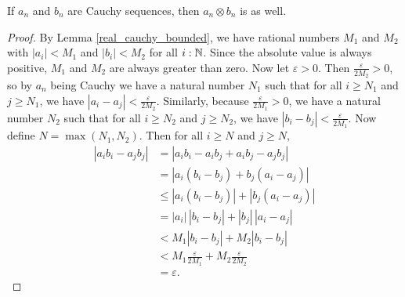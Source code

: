 \documentclass[../../math.tex]{subfiles}
\begin{document}
\begin{lemma}
    If $a_n$ and $b_n$ are Cauchy sequences, then $a_n \otimes b_n$ is as well.
\end{lemma}
\begin{proof}
    By Lemma \ref{real_cauchy_bounded}, we have rational numbers $M_1$ and $M_2$
    with $|a_i| < M_1$ and $|b_i| < M_2$ for all $i : \mathbb{N}$.  Since the absolute
    value is always positive, $M_1$ and $M_2$ are always greater than zero.  Now
    let $\varepsilon > 0$.  Then $\frac{\varepsilon}{2M_2} > 0$, so by $a_n$
    being Cauchy we have a natural number $N_1$ such that for all $i \geq N_1$
    and $j \geq N_1$, we have $|a_i - a_j| < \frac{\varepsilon}{2M_2}$.
    Similarly, because $\frac{\varepsilon}{2M_1} > 0$, we have a natural number
    $N_2$ such that for all $i \geq N_2$ and $j \geq N_2$, we have $|b_i - b_j|
    < \frac{\varepsilon}{2M_1}$.  Now define $N = \max(N_1, N_2)$.  Then for all
    $i \geq N$ and $j \geq N$,
    \begin{align*}
        |a_i b_i - a_j b_j|
        &= |a_i b_i - a_i b_j + a_i b_j - a_j b_j| \\
        &= |a_i (b_i - b_j) + b_j (a_i - a_j)| \\
        &\leq |a_i (b_i - b_j)| + |b_j (a_i - a_j)| \\
        &= |a_i|\, |b_i - b_j| + |b_j|\, |a_i - a_j| \\
        &< M_1 |b_i - b_j| + M_2 |b_i - b_j| \\
        &< M_1 \frac{\varepsilon}{2M_1} + M_2 \frac{\varepsilon}{2M_2} \\
        &= \varepsilon.
    \end{align*}
\end{proof}
\end{document}

